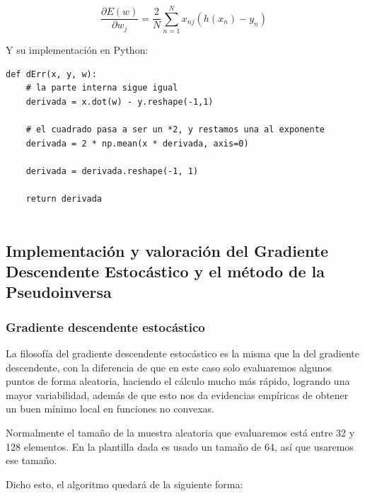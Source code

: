 \documentclass[12pt, spanish]{article}
\begin{document}
$$\frac{\partial E(w)}{\partial w_j} = \frac{2}{N}\sum_{n=1}^{N} x_{nj}(h(x_n) - y_n) $$

Y su implementación en Python:

\begin{lstlisting}
def dErr(x, y, w):
	# la parte interna sigue igual
	derivada = x.dot(w) - y.reshape(-1,1)

	# el cuadrado pasa a ser un *2, y restamos una al exponente
	derivada = 2 * np.mean(x * derivada, axis=0)

	derivada = derivada.reshape(-1, 1)

	return derivada
	
\end{lstlisting}


\newpage


\subsection{Implementación y valoración del Gradiente Descendente Estocástico y el método de la Pseudoinversa}

\subsubsection{Gradiente descendente estocástico}

La filosofía del gradiente descendente estocástico es la misma que la del gradiente descendente, con la diferencia de que en este caso solo evaluaremos algunos puntos de forma aleatoria, haciendo el cálculo mucho más rápido, logrando una mayor variabilidad, además de que esto nos da evidencias empíricas de obtener un buen mínimo local en funciones no convexas.

Normalmente el tamaño de la muestra aleatoria que evaluaremos está entre 32 y 128 elementos. En la plantilla dada es usado un tamaño de 64, así que usaremos ese tamaño.

Dicho esto, el algoritmo quedará de la siguiente forma:
\end{document}
